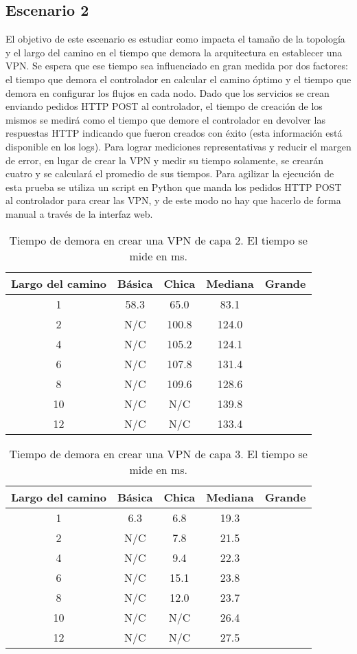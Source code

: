 \subsection{Escenario 2}
El objetivo de este escenario es estudiar como impacta el tamaño de la topología y el largo del camino en el tiempo que demora la arquitectura en establecer una VPN. Se espera que ese tiempo sea influenciado en gran medida por dos factores: el tiempo que demora el controlador en calcular el camino óptimo y el tiempo que demora en configurar los flujos en cada nodo. Dado que los servicios se crean enviando pedidos HTTP POST al controlador, el tiempo de creación de los mismos se medirá como el tiempo que demore el controlador en devolver las respuestas HTTP indicando que fueron creados con éxito (esta información está disponible en los logs). Para lograr mediciones representativas y reducir el margen de error, en lugar de crear la VPN y medir su tiempo solamente, se crearán cuatro y se calculará el promedio de sus tiempos. Para agilizar la ejecución de esta prueba se utiliza un script en Python que manda los pedidos HTTP POST al controlador para crear las VPN, y de este modo no hay que hacerlo de forma manual a través de la interfaz web.

\begin{table}[ht]
	\caption{Tiempo de demora en crear una VPN de capa 2. El tiempo se mide en ms.}
	\centering 
	\begin{tabular}{c c c c c}
		\hline\hline
		Largo del camino & Básica & Chica & Mediana  & Grande \\ [0.5ex]
		\hline
		1 & 58.3 & 65.0 & 83.1 &  \\
		2 & N/C & 100.8 & 124.0 &  \\
		4 & N/C & 105.2 & 124.1 &  \\
		6 & N/C & 107.8 & 131.4 &  \\
		8 & N/C & 109.6 & 128.6 &  \\
		10 & N/C & N/C & 139.8 &  \\
		12 & N/C & N/C & 133.4 &  \\ [1ex]
		\hline
	\end{tabular}
	\label{table:tiempo_vpn_2}
\end{table}

\begin{table}[ht]
	\caption{Tiempo de demora en crear una VPN de capa 3. El tiempo se mide en ms.}
	\centering 
	\begin{tabular}{c c c c c}
		\hline\hline
		Largo del camino & Básica & Chica & Mediana  & Grande \\ [0.5ex]
		\hline
		1 & 6.3 & 6.8 & 19.3 &  \\
		2 & N/C & 7.8 & 21.5 &  \\
		4 & N/C & 9.4 & 22.3 &  \\
		6 & N/C & 15.1 & 23.8 &  \\
		8 & N/C & 12.0 & 23.7 &  \\
		10 & N/C & N/C & 26.4 &  \\
		12 & N/C & N/C & 27.5 &  \\ [1ex]
		\hline
	\end{tabular}
	\label{table:tiempo_vpn_3}
\end{table}

